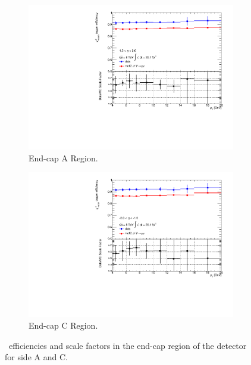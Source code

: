 \begin{figure}[htbp]
  \centering
  \begin{subfigure}[b]{0.85\textwidth}
    \includegraphics[width=\textwidth]{PartCalibration2012/Plots/SFPlots/Endcap_A_smt.pdf}
    \caption{End-cap A Region.} \label{fig:CalibrationScaleFactorEndcapA}
  \end{subfigure}
  
  \begin{subfigure}[b]{0.85\textwidth}
    \includegraphics[width=\textwidth]{PartCalibration2012/Plots/SFPlots/Endcap_C_smt.pdf}
    \caption{End-cap C Region.} \label{fig:CalibrationScaleFactorEndcapC}
  \end{subfigure}
  \caption[\xsm\ efficiencies and scale factors in the end-cap region of the detector for side A and C.]{\xsm\ efficiencies and scale factors in the end-cap region of the detector for side  A and  C.} \label{fig:CalibrationScaleFactorEndcap}
\end{figure}

